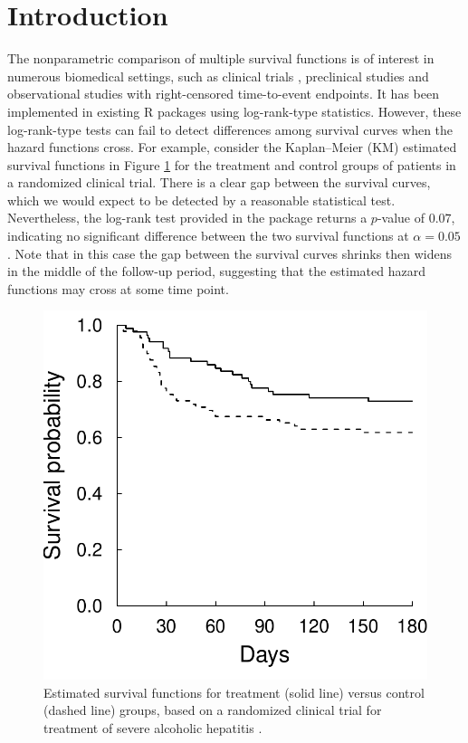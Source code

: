 \section{Introduction} %
The nonparametric comparison of multiple survival functions is of interest in numerous biomedical settings, such as clinical trials \citep{Retal:2015}, preclinical studies \citep{Letal:2015} and observational studies \citep{Letal:2013} with right-censored time-to-event endpoints.  It has been implemented in existing R packages using log-rank-type statistics. However, these log-rank-type tests
can fail to detect differences among survival curves when the hazard functions cross.
For example, consider the Kaplan--Meier (KM) estimated survival functions in Figure \ref{fig:hepatitis} for the treatment and control groups of patients in a randomized clinical trial. There is a clear gap between the survival curves, which we would expect to be detected by a reasonable statistical test. Nevertheless, the log-rank test provided in the  \cite[][]{survival:2018} package returns a $p$-value of $0.07$, indicating no significant difference between the two survival functions at $\alpha=0.05$. 
Note that in this case the gap between the survival curves shrinks then widens in the middle of the follow-up period, suggesting that the estimated hazard functions may cross at some time point.


\begin{figure}[H]
	\centerline{\includegraphics[width=0.5\columnwidth]{figures/paper_survELTest_hep_surv_20191220.pdf}} %
	\caption{Estimated survival functions for treatment (solid line) versus control (dashed line) groups, based on a randomized clinical trial for treatment of severe alcoholic hepatitis \citep[][]{hepatitis:2011}.}
	\label{fig:hepatitis}
\end{figure}

